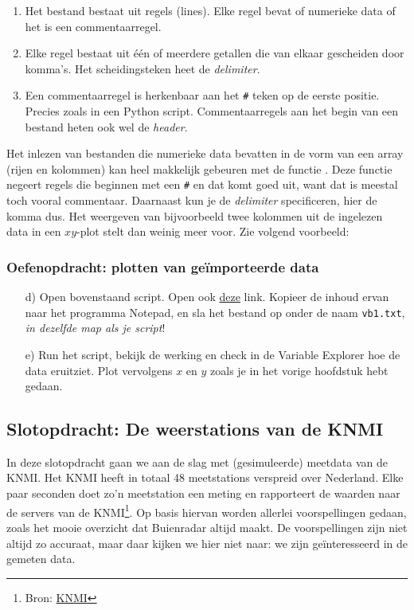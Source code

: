\documentclass[a4paper,11pt, fleqn]{article}
\begin{document}
\begin{enumerate}
	\setlength\itemsep{0em}
	\item Het bestand bestaat uit regels (lines). Elke regel bevat of numerieke data of het is een commentaarregel.
	\item Elke regel bestaat uit \'e\'en of meerdere getallen die van elkaar gescheiden door komma's. Het scheidingsteken heet de \textit{delimiter}.
	\item Een commentaarregel is herkenbaar aan het \verb,#, teken op de eerste positie. Precies zoals in een Python script. Commentaarregels aan het begin van een bestand heten ook wel de {\it header}.
\end{enumerate}

Het inlezen van bestanden die numerieke data bevatten in de vorm van een array (rijen en kolommen) kan heel makkelijk gebeuren met de  functie . Deze functie negeert regels die beginnen met een \verb,#, en dat komt goed uit, want dat is meestal toch vooral commentaar. Daarnaast kun je de {\it delimiter} specificeren, hier de komma dus. Het weergeven van bijvoorbeeld twee kolommen uit de ingelezen data in een $xy$-plot stelt dan weinig meer voor. Zie volgend voorbeeld:
 

\subsubsection*{Oefenopdracht: plotten van geïmporteerde data}
\begin{itemize}
	\setlength\itemsep{0em}
	\item[d)] Open bovenstaand script. Open ook \href{https://github.com/Ichthus-College-IN/Python-x-Meet-je-leefomgeving/blob/main/inc/h4/vb1.txt}{deze} link. Kopieer de inhoud ervan naar het programma Notepad, en sla het bestand op onder de naam \verb,vb1.txt,, {\it in dezelfde map als je script}! 
	\item[e)] Run het script, bekijk de werking en check in de Variable Explorer hoe de data eruitziet. Plot vervolgens $x$ en $y$ zoals je in het vorige hoofdstuk hebt gedaan.
\end{itemize}

\subsection{Slotopdracht: De weerstations van de KNMI}
In deze slotopdracht gaan we aan de slag met (gesimuleerde) meetdata van de KNMI. Het KNMI heeft in totaal 48 meetstations verspreid over Nederland. Elke paar seconden doet zo'n meetstation een meting en rapporteert de waarden naar de servers van de KNMI\footnote{Bron: \href{https://www.knmi.nl/kennis-en-datacentrum/uitleg/automatische-weerstations}{KNMI}}. Op basis hiervan worden allerlei voorspellingen gedaan, zoals het mooie overzicht dat Buienradar altijd maakt. De voorspellingen zijn niet altijd zo accuraat, maar daar kijken we hier niet naar: we zijn ge\"interesseerd in de gemeten data.
\end{document}
